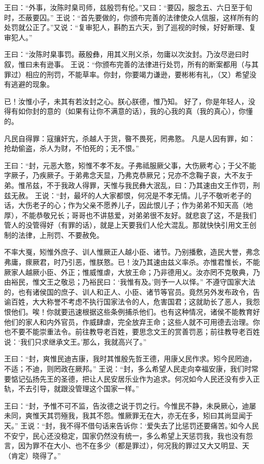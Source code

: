\documentclass[a4paper,12pt,UTF8,twoside]{ctexbook}
\begin{document}
王曰：“外事，汝陈时臬司师，兹殷罚有伦。”又曰：“要囚，服念五、六日至于旬时，丕蔽要囚。”
王说：“首先要做的，你颁布完善的法律使众人信服，这样所有的处罚就公正了。”又说：“复审犯人，斟酌五六天，到了巡视的时候，好好断理、复审犯人。”

王曰：“汝陈时臬事罚。蔽殷彝，用其义刑义杀，勿庸以次汝封。乃汝尽逊曰时叙，惟曰未有逊事。
王说：“你颁布完善的法律进行处罚，所有的断案都用（与其罪过）相应的刑罚，不能草率。你封，你要竭力谦逊，要彬彬有礼，（又）希望没有逃避的现象。

已！汝惟小子，未其有若汝封之心。朕心朕德，惟乃知。
好了，你是年轻人，没得有如你封的意的（如果有让你不满意的话），我的心我的真（我的真心），你懂的。

凡民自得罪：寇攘奸宄，杀越人于货，暋不畏死，罔弗憝。
凡是人因有罪，如：抢劫偷盗，杀人为财，不怕死的；无不恨。”

王曰：“封，元恶大憝，矧惟不孝不友。子弗祗服厥父事，大伤厥考心；于父不能字厥子，乃疾厥子。于弟弗念天显，乃弗克恭厥兄；兄亦不念鞠子哀，大不友于弟。惟吊兹，不于我政人得罪，天惟与我民彝大泯乱，曰：乃其速由文王作罚，刑兹无赦。
王说：“封，最坏的人大家都恨，何况是不孝无情。儿子不敬听老子的话，大伤老子的心；作为父亲不愿养儿子，因此恨儿子；作为弟弟不知天高（地厚），不能恭敬兄长；哥哥也不讲慈爱，对弟弟很不友好。就悲哀了这，不是我们管人的没管得好（有罪的话），就是上天要我们人伦大混乱。那就快快引用文王创制的法律，上刑罚、不要赦免。

不率大戛，矧惟外庶子、训人惟厥正人越小臣、诸节。乃别播敷，造民大誉，弗念弗庸，瘝厥君，时乃引恶，惟朕憝。已！汝乃其速由兹义率杀。亦惟君惟长，不能厥家人越厥小臣、外正；惟威惟虐，大放王命；乃非德用乂。汝亦罔不克敬典，乃由裕民，惟文王之敬忌；乃裕民曰：‘我惟有及。’则予一人以怿。”
不遵守国家大法的，也有诸侯国的庶子、训人和正人、小臣、诸节等官员。竟然另外发布政令，告谕百姓，大大称誉不考虑不执行国家法令的人，危害国君；这就助长了恶人，我怨恨他们。唉！你就要迅速根据这些条例捕杀他们。也有这种情况，诸侯不能教育好他们的家人和内外官员，作威肆虐，完全放弃王命；这些人就不可用德去治理。你也不要不能崇重法令。前往教导老百姓，要思念文王的赏善罚恶；前往教导老百姓说：‘我们只求继承文王。’那么，我就高兴了。”

王曰：“封，爽惟民迪吉康，我时其惟殷先哲王德，用康乂民作求。矧今民罔迪，不适；不迪，则罔政在厥邦。”
王说：“封，多么希望人民走向幸福安康，我们时常要惦记弘扬先王的圣德，把让人民安居乐业作为追求。何况如今人民还没有步入正轨，不去引导，就跟没管理这个国家一样。”

王曰：“封，予惟不可不监，告汝德之说于罚之行。今惟民不静，未戾厥心，迪屡未同，爽惟天其罚殛我，我其不怨。惟厥罪无在大，亦无在多，矧曰其尚显闻于天。”
王说：“封，我不得不借句话来告诉你：‘爱失去了比惩罚还要痛苦。’如今人民不安宁，民心还没稳定，国家仍然没有统一，多么希望上天惩罚我，我也没有怨言，因为罪不在大小、也不在多少（都是罪过），何况我的罪过又大又明显、天（肯定）晓得了。”
\end{document}
